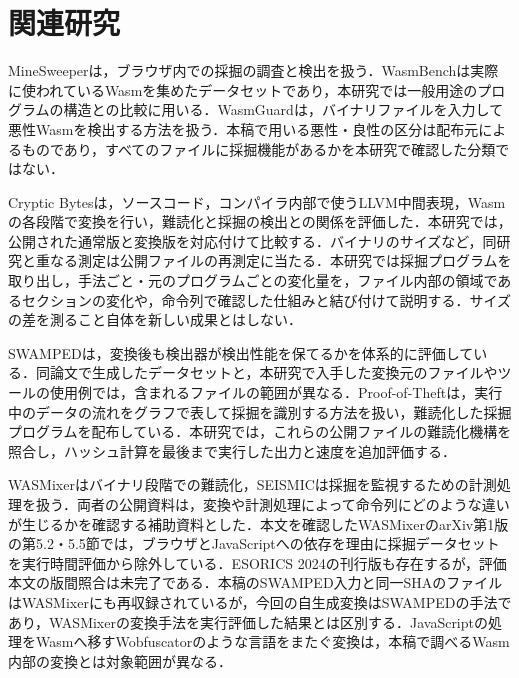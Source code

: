 \documentclass[submit,techrep]{ipsj}
\begin{document}
\section{関連研究}
MineSweeperは，ブラウザ内での採掘の調査と検出を扱う\cite{konoth2018}．WasmBenchは実際に使われているWasmを集めたデータセットであり\cite{hilbig2021}，本研究では一般用途のプログラムの構造との比較に用いる．WasmGuardは，バイナリファイルを入力して悪性Wasmを検出する方法を扱う\cite{sun2025}．本稿で用いる悪性・良性の区分は配布元によるものであり，すべてのファイルに採掘機能があるかを本研究で確認した分類ではない．

Cryptic Bytesは，ソースコード，コンパイラ内部で使うLLVM中間表現，Wasmの各段階で変換を行い，難読化と採掘の検出との関係を評価した\cite{harnes2024}．本研究では，公開された通常版と変換版を対応付けて比較する．バイナリのサイズなど，同研究と重なる測定は公開ファイルの再測定に当たる．本研究では採掘プログラムを取り出し，手法ごと・元のプログラムごとの変化量を，ファイル内部の領域であるセクションの変化や，命令列で確認した仕組みと結び付けて説明する．サイズの差を測ること自体を新しい成果とはしない．

SWAMPEDは，変換後も検出器が検出性能を保てるかを体系的に評価している\cite{kim2025}．同論文で生成したデータセットと，本研究で入手した変換元のファイルやツールの使用例では，含まれるファイルの範囲が異なる．Proof-of-Theftは，実行中のデータの流れをグラフで表して採掘を識別する方法を扱い，難読化した採掘プログラムを配布している\cite{sermchaiwong2026}．本研究では，これらの公開ファイルの難読化機構を照合し，ハッシュ計算を最後まで実行した出力と速度を追加評価する．

WASMixerはバイナリ段階での難読化\cite{cao2023}，SEISMICは採掘を監視するための計測処理を扱う\cite{wang2018seismic}．両者の公開資料は，変換や計測処理によって命令列にどのような違いが生じるかを確認する補助資料とした．本文を確認したWASMixerのarXiv第1版の第5.2・5.5節では，ブラウザとJavaScriptへの依存を理由に採掘データセットを実行時間評価から除外している\cite{cao2023}．ESORICS 2024の刊行版も存在するが\cite{cao2024published}，評価本文の版間照合は未完了である．本稿のSWAMPED入力と同一SHAのファイルはWASMixerにも再収録されているが，今回の自生成変換はSWAMPEDの手法であり，WASMixerの変換手法を実行評価した結果とは区別する．JavaScriptの処理をWasmへ移すWobfuscator\cite{romano2022}のような言語をまたぐ変換は，本稿で調べるWasm内部の変換とは対象範囲が異なる．
\end{document}
